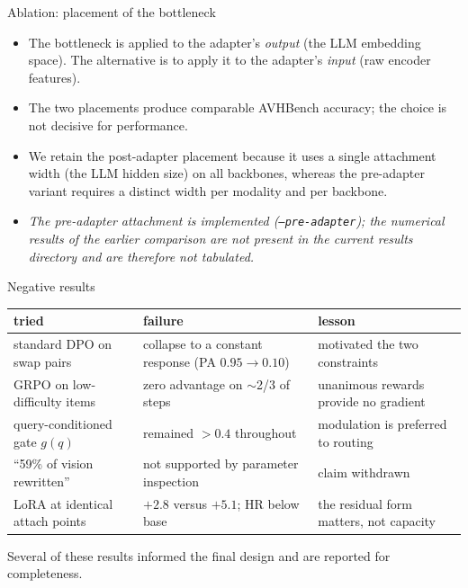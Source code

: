 \documentclass[aspectratio=169,11pt]{beamer}
\begin{document}
\begin{frame}{Ablation: placement of the bottleneck}
\centering
{}
\vspace{0.6em}
\begin{itemize}\footnotesize
\item The bottleneck is applied to the adapter's \emph{output} (the LLM embedding space). The
alternative is to apply it to the adapter's \emph{input} (raw encoder features).
\item The two placements produce comparable AVHBench accuracy; the choice is not decisive for
performance.
\item We retain the post-adapter placement because it uses a single attachment width (the LLM
hidden size) on all backbones, whereas the pre-adapter variant requires a distinct width per
modality and per backbone.
\item[] {\footnotesize\emph{The pre-adapter attachment is implemented (\texttt{--pre-adapter}); the
numerical results of the earlier comparison are not present in the current results directory and are
therefore not tabulated.}}
\end{itemize}
\end{frame}

\begin{frame}{Negative results}
\centering
\renewcommand{\arraystretch}{1.3}
\scriptsize
\begin{tabular}{l l l}
\toprule
tried & failure & lesson \\
\midrule
standard DPO on swap pairs & collapse to a constant response (PA $0.95\!\to\!0.10$) & motivated the two constraints \\
GRPO on low-difficulty items & zero advantage on $\sim$2/3 of steps & unanimous rewards provide no gradient \\
query-conditioned gate $g(q)$ & remained $>0.4$ throughout & modulation is preferred to routing \\
``59\% of vision rewritten'' & not supported by parameter inspection & claim withdrawn \\
LoRA at identical attach points & $+2.8$ versus $+5.1$; HR below base & the residual form matters, not capacity \\
\bottomrule
\end{tabular}
\vfill
{\footnotesize Several of these results informed the final design and are reported for completeness.}
\end{frame}
\end{document}
